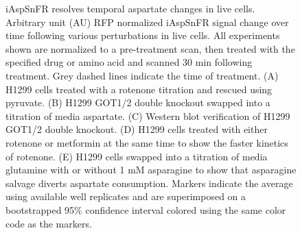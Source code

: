 \documentclass[9pt,lineno]{elife}
\begin{document}
\begin{figure}[ht!]
\centering
{}
\caption{
iAspSnFR resolves temporal aspartate changes in live cells.
Arbitrary unit (AU) RFP normalized iAspSnFR signal change over time following various perturbations in live cells.
All experiments shown are normalized to a pre-treatment scan, then treated with the specified drug or amino acid and scanned 30 min following treatment.
Grey dashed lines indicate the time of treatment.
(A) H1299 cells treated with a rotenone titration and rescued using pyruvate.
(B) H1299 GOT1/2 double knockout swapped into a titration of media aspartate.
(C) Western blot verification of H1299 GOT1/2 double knockout.
(D) H1299 cells treated with either rotenone or metformin at the same time to show the faster kinetics of rotenone.
(E) H1299 cells swapped into a titration of media glutamine with or without 1 mM asparagine to show that asparagine salvage diverts aspartate consumption.
Markers indicate the average using available well replicates and are superimposed on a bootstrapped 95\% confidence interval colored using the same color code as the markers.
}
\label{fig:Fig2}
\end{figure}
\end{document}

